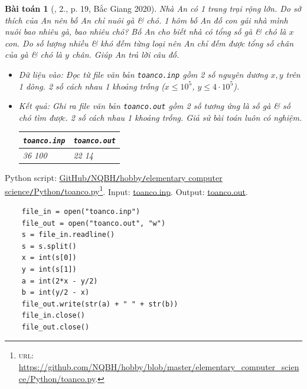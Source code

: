 \documentclass{article}
\newtheorem{baitoan}{Bài toán}
\begin{document}
\begin{baitoan}[\cite{VietSTEM2021}, 2., p. 19, Bắc Giang 2020]
	Nhà An có 1 trang trại rộng lớn. Do sở thích của An nên bố An chỉ nuôi gà \& chó. 1 hôm bố An đố con gái nhà mình nuôi bao nhiêu gà, bao nhiêu chó? Bố An cho biết nhà có tổng số gà \& chó là $x$ con. Do số lượng nhiều \& khó đếm từng loại nên An chỉ đếm được tổng số chân của gà \& chó là $y$ chân. Giúp An trả lời câu đố.
	\begin{itemize}
		\item {\sf Dữ liệu vào:} Đọc từ file văn bản \verb|toanco.inp| gồm 2 số nguyên dương $x,y$ trên 1 dòng. 2 số cách nhau 1 khoảng trống ($x\le10^5$, $y\le4\cdot10^5$).
		\item {\sf Kết quả:} Ghi ra file văn bản \verb|toanco.out| gồm 2 số tương ứng là số gà \& số chó tìm được. 2 số cách nhau 1 khoảng trống. Giả sử bài toán luôn có nghiệm.
		\begin{table}[H]
			\centering
			\begin{tabular}{|l|l|}
				\hline
				\texttt{toanco.inp} & \texttt{toanco.out} \\
				\hline
				36 100 & 22 14 \\
				\hline
			\end{tabular}
		\end{table}
	\end{itemize}
\end{baitoan}
Python script: \href{https://github.com/NQBH/hobby/blob/master/elementary_computer_science/Python/toanco.py}{GitHub\texttt{/}NQBH\texttt{/}hobby\texttt{/}elementary computer science\texttt{/}Python\texttt{/}toanco.py}\footnote{\textsc{url}: \url{https://github.com/NQBH/hobby/blob/master/elementary_computer_science/Python/toanco.py}.}. Input: \href{https://github.com/NQBH/hobby/blob/master/elementary_computer_science/Python/toanco.inp}{toanco.inp}. Output: \href{https://github.com/NQBH/hobby/blob/master/elementary_computer_science/Python/toanco.out}{toanco.out}.
\begin{verbatim}
	file_in = open("toanco.inp")
	file_out = open("toanco.out", "w")
	s = file_in.readline()
	s = s.split()
	x = int(s[0])
	y = int(s[1])
	a = int(2*x - y/2)
	b = int(y/2 - x)
	file_out.write(str(a) + " " + str(b))
	file_in.close()
	file_out.close()
\end{verbatim}
\end{document}

